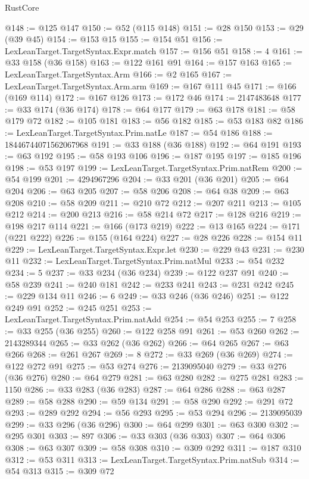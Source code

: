 \begin{lexlean}{RustCore}
\begin{coremodule}
@148 := @125 @147
@150 := @52 (@115 @148)
@151 := @28 @150
@153 := @29 (@39 @45)
@154 := @153 @15
@155 := @154 @51
@156 := LexLeanTarget.TargetSyntax.Expr.match
@157 := @156 @51
@158 := 4
@161 := @33 @158 (@36 @158)
@163 := @122 @161 @91
@164 := @157 @163
@165 := LexLeanTarget.TargetSyntax.Arm
@166 := @2 @165
@167 := LexLeanTarget.TargetSyntax.Arm.arm
@169 := @167 @111 @45
@171 := @166 (@169 @114)
@172 := @167 @126
@173 := @172 @46
@174 := 2147483648
@177 := @33 @174 (@36 @174)
@178 := @64 @177
@179 := @63 @178
@181 := @58 @179 @72
@182 := @105 @181
@183 := @56 @182
@185 := @53 @183 @82
@186 := LexLeanTarget.TargetSyntax.Prim.natLe
@187 := @54 @186
@188 := 18446744071562067968
@191 := @33 @188 (@36 @188)
@192 := @64 @191
@193 := @63 @192
@195 := @58 @193 @106
@196 := @187 @195
@197 := @185 @196
@198 := @53 @197
@199 := LexLeanTarget.TargetSyntax.Prim.natRem
@200 := @54 @199
@201 := 4294967296
@204 := @33 @201 (@36 @201)
@205 := @64 @204
@206 := @63 @205
@207 := @58 @206
@208 := @64 @38
@209 := @63 @208
@210 := @58 @209
@211 := @210 @72
@212 := @207 @211
@213 := @105 @212
@214 := @200 @213
@216 := @58 @214 @72
@217 := @128 @216
@219 := @198 @217 @114
@221 := @166 (@173 @219)
@222 := @13 @165
@224 := @171 (@221 @222)
@226 := @155 (@164 @224)
@227 := @28 @226
@228 := @154 @11
@229 := LexLeanTarget.TargetSyntax.Expr.let
@230 := @229 @43
@231 := @230 @11
@232 := LexLeanTarget.TargetSyntax.Prim.natMul
@233 := @54 @232
@234 := 5
@237 := @33 @234 (@36 @234)
@239 := @122 @237 @91
@240 := @58 @239
@241 := @240 @181
@242 := @233 @241
@243 := @231 @242
@245 := @229 @134 @11
@246 := 6
@249 := @33 @246 (@36 @246)
@251 := @122 @249 @91
@252 := @245 @251
@253 := LexLeanTarget.TargetSyntax.Prim.natAdd
@254 := @54 @253
@255 := 7
@258 := @33 @255 (@36 @255)
@260 := @122 @258 @91
@261 := @53 @260
@262 := 2143289344
@265 := @33 @262 (@36 @262)
@266 := @64 @265
@267 := @63 @266
@268 := @261 @267
@269 := 8
@272 := @33 @269 (@36 @269)
@274 := @122 @272 @91
@275 := @53 @274
@276 := 2139095040
@279 := @33 @276 (@36 @276)
@280 := @64 @279
@281 := @63 @280
@282 := @275 @281
@283 := 1150
@286 := @33 @283 (@36 @283)
@287 := @64 @286
@288 := @63 @287
@289 := @58 @288
@290 := @59 @134
@291 := @58 @290
@292 := @291 @72
@293 := @289 @292
@294 := @56 @293
@295 := @53 @294
@296 := 2139095039
@299 := @33 @296 (@36 @296)
@300 := @64 @299
@301 := @63 @300
@302 := @295 @301
@303 := 897
@306 := @33 @303 (@36 @303)
@307 := @64 @306
@308 := @63 @307
@309 := @58 @308
@310 := @309 @292
@311 := @187 @310
@312 := @53 @311
@313 := LexLeanTarget.TargetSyntax.Prim.natSub
@314 := @54 @313
@315 := @309 @72

\end{coremodule}
\end{lexlean}
